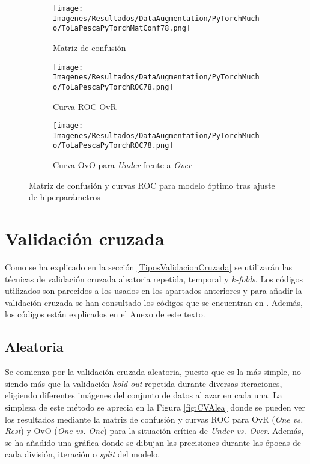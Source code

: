 \documentclass{report}
\begin{document}
\vspace{0.4cm}
\begin{figure}[H]
	 	\centering
	 	\begin{subfigure}[b]{0.45\linewidth}
	 	\centering
	 		\texttt{[image: Imagenes/Resultados/DataAugmentation/PyTorchMucho/ToLaPescaPyTorchMatConf78.png]}
	 		\caption{ Matriz de confusión }
                    \label{fig:HiperFinalMatConf}
	 	\end{subfigure}
	 	\begin{subfigure}[b]{0.45\linewidth}
	 	\centering
	 		\texttt{[image: Imagenes/Resultados/DataAugmentation/PyTorchMucho/ToLaPescaPyTorchROC78.png]}
                    \caption{ Curva ROC OvR}
                    \label{fig:HiperFinalROCOvR}
	 	\end{subfigure}
            \begin{subfigure}[b]{0.45\linewidth}
	 	\centering
	 		\texttt{[image: Imagenes/Resultados/DataAugmentation/PyTorchMucho/ToLaPescaPyTorchROC78.png]}
                    \caption{ Curva OvO para \textit{Under} frente a \textit{Over} }
                    \label{fig:HiperFinalROCOvO}
	 	\end{subfigure}
	 	\caption{ Matriz de confusión y curvas ROC para modelo óptimo tras ajuste de hiperparámetros }
	 	\label{fig:HiperFinal}
\end{figure}

\newpage
\section{Validación cruzada}


Como se ha explicado en la sección \ref{TiposValidacionCruzada} se utilizarán las técnicas de validación cruzada aleatoria repetida, temporal y \textit{k-folds}. Los códigos utilizados son parecidos a los usados en los apartados anteriores y para añadir la validación cruzada se han consultado los códigos que se encuentran en \cite{CVGithub}. Además, los códigos están explicados en el Anexo de este texto.

\subsection{Aleatoria}

Se comienza por la validación cruzada aleatoria, puesto que es la más simple, no siendo más que la validación \textit{hold out} repetida durante diversas iteraciones, eligiendo diferentes imágenes del conjunto de datos al azar en cada una. La simpleza de este método se aprecia en la Figura \ref{fig:CVAlea} donde se pueden ver los resultados mediante la matriz de confusión y curvas ROC para OvR (\textit{One vs. Rest}) y OvO (\textit{One vs. One}) para la situación crítica de \textit{Under vs. Over}. Además, se ha añadido una gráfica donde se dibujan las precisiones durante las épocas de cada división, iteración o \textit{split} del modelo.
\end{document}
